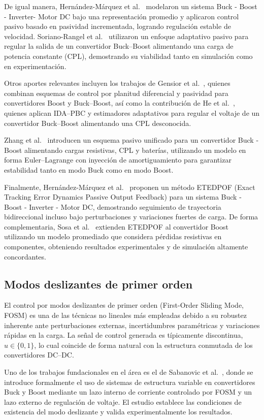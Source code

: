 \documentclass[12pt,oneside,openany]{book}
\begin{document}
De igual manera, Hernández-Márquez et al.~\cite{ea_5} modelaron un sistema Buck - Boost - Inverter- Motor DC 
bajo una representación promedio y aplicaron control pasivo basado en pasividad incrementada, logrando regulación estable de velocidad. Soriano-Rangel et al.~\cite{ea_6} utilizaron un enfoque adaptativo pasivo para regular la salida de un convertidor Buck–Boost alimentando una carga de potencia constante (CPL), demostrando su viabilidad tanto en simulación como en experimentación.

Otros aportes relevantes incluyen los trabajos de Gensior et al.~\cite{ea_8}, quienes combinan esquemas de control por planitud diferencial y pasividad para convertidores Boost y Buck–Boost, así como la contribución de He et al.~\cite{ea_9}, quienes aplican IDA–PBC y estimadores adaptativos para regular el voltaje de un convertidor Buck–Boost alimentando una CPL desconocida.

Zhang et al.~\cite{ea_10} introducen un esquema pasivo unificado para un convertidor Buck - Boost alimentando cargas resistivas, CPL y baterías, utilizando un modelo en forma Euler–Lagrange con inyección de amortiguamiento para garantizar estabilidad tanto en modo Buck como en modo Boost.

Finalmente, Hernández-Márquez et al.~\cite{ea_11} proponen un método ETEDPOF (Exact Tracking Error Dynamics Passive Output Feedback) para un sistema Buck - Boost - Inverter - Motor DC, demostrando seguimiento de trayectoria bidireccional incluso bajo perturbaciones y variaciones fuertes de carga. De forma complementaria, Sosa et al.~\cite{ea_12} extienden ETEDPOF al convertidor Boost utilizando un modelo promediado que considera pérdidas resistivas en componentes, obteniendo resultados experimentales y de simulación altamente concordantes.

\subsection{Modos deslizantes de primer orden}

El control por modos deslizantes de primer orden (First-Order Sliding Mode, FOSM) es una de las técnicas no lineales más empleadas debido a su robustez inherente ante perturbaciones externas, incertidumbres paramétricas y variaciones rápidas en la carga. La señal de control generada es típicamente discontinua, \(u \in \{0,1\}\), lo cual coincide de forma natural con la estructura conmutada de los convertidores DC–DC.

Uno de los trabajos fundacionales en el área es el de Sabanovic et al.~\cite{ea_sabanovic}, donde se introduce formalmente el uso de sistemas de estructura variable en convertidores Buck y Boost mediante un lazo interno de corriente controlado por FOSM y un lazo externo de regulación de voltaje. El estudio establece las condiciones de existencia del modo deslizante y valida experimentalmente los resultados.
\end{document}
